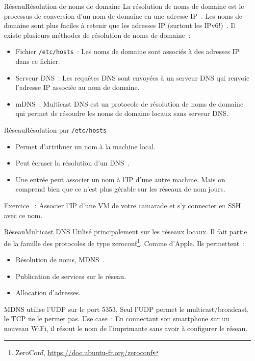 \documentclass{beamer}
\begin{document}
    \begin{frame}{Réseau}{Résolution de noms de domaine}
        La résolution de noms de domaine est le processus de conversion d'un nom de domaine en une adresse IP~.
        \bigbreak
        Les noms de domaine sont plus faciles à retenir que les adresses IP (surtout les IPv6!)~.
        \bigbreak
        Il existe plusieurs méthodes de résolution de noms de domaine~:
        \begin{itemize}
            \item Fichier \lstinline{/etc/hosts}~: Les noms de domaine sont associés à des adresses IP dans ce fichier.
            \item Serveur DNS~: Les requêtes DNS sont envoyées à un serveur DNS qui renvoie l'adresse IP associée au nom de domaine.
            \item mDNS~: Multicast DNS est un protocole de résolution de noms de domaine qui permet de résoudre les noms de domaine locaux sans serveur DNS.
        \end{itemize}
    \end{frame}

    \begin{frame}{Réseau}{Résolution par \lstinline{/etc/hosts}}
        \begin{itemize}
            \item Permet d'attribuer un nom à la machine local.
            \item Peut écraser la résolution d'un DNS~.
            \item Une entrée peut associer un nom à l'IP d'une autre machine.
            Mais on comprend bien que ce n'est plus gérable sur les réseaux de nom jours.
        \end{itemize}
        \bigbreak
        Exercice \execcounterdispinc~: Associer l'IP d'une VM de votre camarade et s'y connecter en SSH avec ce nom.
    \end{frame}

    \begin{frame}{Réseau}{Multicast DNS}
        Utilisé principalement sur les réseaux locaux.
        Il fait partie de la famille des protocoles de type zeroconf\footnote{ZeroConf, \url{https://doc.ubuntu-fr.org/zeroconf}}.
        Comme  d'Apple.
        Ils permettent~:
        \begin{itemize}
            \item  Résolution de noms, MDNS~.
            \item  Publication de services sur le réseau.
            \item  Allocation d'adresses.
        \end{itemize}
        \bigbreak
        MDNS utilise l'UDP sur le port 5353.
        Seul l'UDP permet le multicast/broadcast, le TCP ne le permet pas.
        \bigbreak
        Use case~: En connectant son smartphone sur un nouveau WiFi, il résout le nom de l'imprimante sans avoir à configurer le réseau.
    \end{frame}
\end{document}
